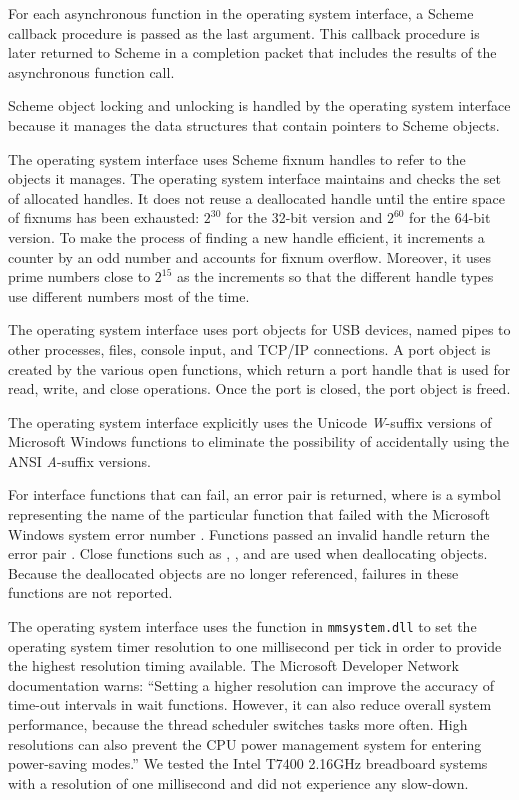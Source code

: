 For each asynchronous function in the operating system interface, a
Scheme callback procedure is passed as the last argument.  This
callback procedure is later returned to Scheme in a completion packet
that includes the results of the asynchronous function call.

Scheme object locking and unlocking is handled by the operating system
interface because it manages the data structures that contain pointers
to Scheme objects.

The operating system interface uses Scheme fixnum handles to refer to
the objects it manages.  \mitigation The operating system
interface maintains and checks the set of allocated handles.  It does
not reuse a deallocated handle until the entire space of fixnums has
been exhausted: $2^{30}$ for the 32-bit version and $2^{60}$ for the
64-bit version.  To make the process of finding a new handle
efficient, it increments a counter by an odd number and accounts for
fixnum overflow. Moreover, it uses prime numbers close to $2^{15}$ as
the increments so that the different handle types use different
numbers most of the time.

The operating system interface uses port objects for USB devices,
named pipes to other processes, files, console input, and TCP/IP
connections.  A port object is created by the various open functions,
which return a port handle that is used for read, write, and close
operations. Once the port is closed, the port object is freed.

The operating system interface explicitly uses the Unicode
\emph{W}-suffix versions of Microsoft Windows functions to eliminate
the possibility of accidentally using the ANSI \emph{A}-suffix
versions.

For interface functions that can fail, an error pair
 is returned, where  is a
symbol representing the name of the particular function that failed
with the Microsoft Windows system error number .  Functions
passed an invalid handle return the error pair
.
Close functions such as , ,
and  are used when deallocating objects.  Because
the deallocated objects are no longer referenced, failures in these
functions are not reported.

The operating system interface uses the  function
in \texttt{mmsystem.dll} to set the operating system timer resolution
to one millisecond per tick in order to provide the highest resolution
timing available. The Microsoft Developer Network documentation warns:
``Setting a higher resolution can improve the accuracy of time-out
intervals in wait functions. However, it can also reduce overall
system performance, because the thread scheduler switches tasks more
often. High resolutions can also prevent the CPU power management
system for entering power-saving modes.''  We tested the Intel T7400
2.16GHz breadboard systems with a resolution of one millisecond and
did not experience any slow-down.

